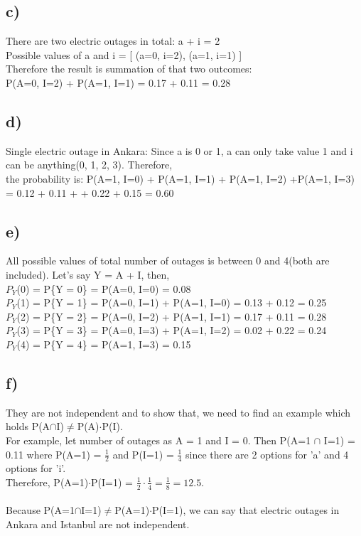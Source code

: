 \documentclass[12pt]{article}
\begin{document}
\subsection*{c)}\noindent 
There are two electric outages in total: a + i = 2\\
Possible values of a and i = [ (a=0, i=2), (a=1, i=1) ]\\
Therefore the result is summation of that two outcomes:\\
P(A=0, I=2) + P(A=1, I=1) = 0.17 + 0.11 = 0.28

\subsection*{d)}\noindent 
Single electric outage in Ankara: Since a is 0 or 1, a can only take value 1 and i can be anything(0, 1, 2, 3). Therefore,\\
the probability is: P(A=1, I=0) + P(A=1, I=1) + P(A=1, I=2) +P(A=1, I=3) = 0.12 + 0.11 + + 0.22 + 0.15 = 0.60

\subsection*{e)}\noindent 
All possible values of total number of outages is between 0 and 4(both are included). Let's say Y = A + I, then,\\
$P_Y$(0) = P\{Y = 0\} = P(A=0, I=0) = 0.08\\
$P_Y$(1) = P\{Y = 1\} = P(A=0, I=1) + P(A=1, I=0) = 0.13 + 0.12 = 0.25\\
$P_Y$(2) = P\{Y = 2\} = P(A=0, I=2) + P(A=1, I=1) = 0.17 + 0.11 = 0.28\\
$P_Y$(3) = P\{Y = 3\} = P(A=0, I=3) + P(A=1, I=2) = 0.02 + 0.22 = 0.24\\
$P_Y$(4) = P\{Y = 4\} = P(A=1, I=3) = 0.15

\subsection*{f)}\noindent 
They are not independent and to show that, we need to find an example which holds P(A$\cap$I)$\neq$P(A)$\cdot$P(I).\\
For example, let number of outages as A = 1 and I = 0. Then P(A=1 $\cap$ I=1) = 0.11 where P(A=1) = $\frac{1}{2}$ and P(I=1) = $\frac{1}{4}$ since there are 2 options for 'a' and 4 options for 'i'.\\
Therefore, P(A=1)$\cdot$P(I=1) = $\frac{1}{2}\cdot\frac{1}{4} = \frac{1}{8} = 12.5$.\\\\
Because P(A=1$\cap$I=1)$\neq$P(A=1)$\cdot$P(I=1), we can say that electric outages in Ankara and Istanbul are not independent.
\end{document}

